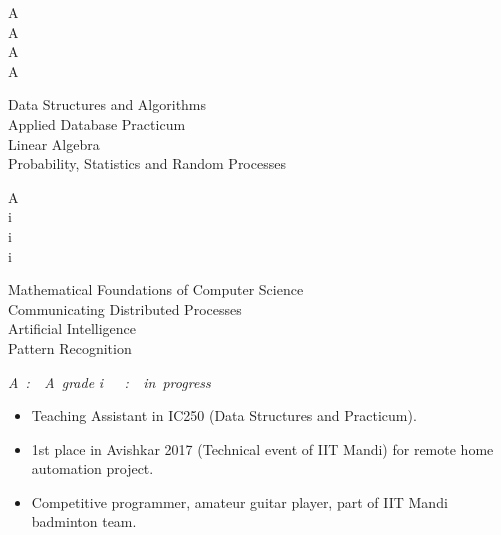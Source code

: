 \documentclass[]{awesome-cv}
\begin{document}
\vspace{-3mm}


\vspace{-5mm}
\begin{cvhonors}
	\begin{minipage}[t]{0.05\textwidth}
		A\\
		A\\
		A\\
		A
	\end{minipage}\begin{minipage}[t]{0.45\textwidth}
		 Data Structures and Algorithms\\	
		 Applied Database Practicum\\	
		 Linear Algebra\\	
		 Probability, Statistics and Random Processes	
	\end{minipage}\begin{minipage}[t]{0.05\textwidth}
		A\\
		i\\
		i\\
		i
	\end{minipage}\begin{minipage}[t]{0.45\textwidth}
		Mathematical Foundations of Computer Science\\
		Communicating Distributed Processes\\
		Artificial Intelligence\\	
		Pattern Recognition\\	
	\end{minipage}	

\color[HTML]{b30000}
\textit{A~:~~A~grade }
\textit{i~~~:~~in~progress}  
	
\end{cvhonors}




\vspace{-5mm}




\begin{itemize}
	\item Teaching Assistant in IC250 (Data Structures and Practicum).
	\item 1st place in Avishkar 2017 (Technical event of IIT Mandi) for remote home automation project.
	\item Competitive programmer, amateur guitar player, part of IIT Mandi badminton team.
\end{itemize}



\vspace{-8mm}
\ 
\end{document}
